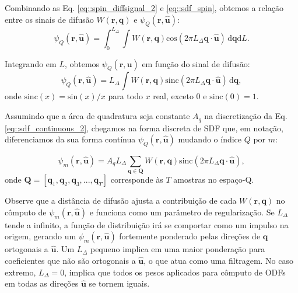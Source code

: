 \documentclass[
    12pt,                %
    oneside,            %
    a4paper,            %
    english,            %
    french,                %
    spanish,            %
    brazil                %
    ]{abntex2}
\begin{document}
Combinando as Eq. \ref{eq::spin_diffsignal_2} e \ref{eq::sdf_spin}, obtemos a relação entre os sinais de difusão $W(\mathbf{r}, \mathbf{q})$ e $\psi_Q(\mathbf{r}, \mathbf{\hat{u}})$:
\begin{equation}
\label{eq::sdf_continuous_1}
    \psi_Q(\mathbf{r}, \mathbf{\hat{u}}) =
    \int_{0}^{L_{\Delta}}\int \! W(\mathbf{r}, \mathbf{q}) \text{cos}(2\pi L_{\Delta} \mathbf{q} \cdot \mathbf{\hat{u}}) \,\mathrm{d}\mathbf{q} \mathrm{d}L .
\end{equation}

Integrando em $L$, obtemos $\psi_Q(\mathbf{r}, \mathbf{\hat{u}})$ em função do sinal de difusão: 
\begin{equation}
\label{eq::sdf_continuous_2}
    \psi_Q(\mathbf{r}, \mathbf{\hat{u}}) =
    L_{\Delta} \int \! W(\mathbf{r}, \mathbf{q}) \text{sinc}(2\pi L_{\Delta} \mathbf{q} \cdot \mathbf{\hat{u}}) \,\mathrm{d}\mathbf{q} ,
\end{equation}
onde $\text{sinc}(x) = \text{sin}(x)/x$ para todo $x$ real, exceto $0$ e $\text{sinc}(0) = 1$.

Assumindo que a área de quadratura seja constante $A_q$ na discretização da Eq. \ref{eq::sdf_continuous_2}, chegamos na forma discreta de SDF que, em notação, diferenciamos da sua forma contínua $\psi_Q(\mathbf{r}, \mathbf{\hat{u}})$ mudando o índice $Q$ por $m$:


\begin{equation}
\label{eq::sdf_discrete_1}
    \psi_m(\mathbf{r}, \mathbf{\hat{u}}) =
     A_qL_{\Delta}\sum_{\mathbf{q} \in \mathbf{Q}} W(\mathbf{r}, \mathbf{q})\text{sinc}(2\pi L_{\Delta} \mathbf{q}\cdot\mathbf{\hat{u}}),
\end{equation}
onde $\mathbf{Q}= [
\mathbf{q}_1,
\mathbf{q}_2,
\mathbf{q}_3, ...,
\mathbf{q}_T
]$ corresponde às $T$ amostras no espaço-Q.

Observe que a distância de difusão ajusta a contribuição de cada $W(\mathbf{r}, \mathbf{q})$ no cômputo de $\psi_m(\mathbf{r}, \mathbf{\hat{u}})$ e funciona como um parâmetro de regularização. Se $L_{\Delta}$ tende a infinito, a função de distribuição irá se comportar como um impulso na origem, gerando um $\psi_m(\mathbf{r}, \mathbf{\hat{u}})$ fortemente ponderado pelas direções de $\mathbf{q}$ ortogonais a $\mathbf{\hat{u}}$. Um $L_{\Delta}$ pequeno implica em uma maior ponderação para coeficientes que não são ortogonais a $\mathbf{\hat{u}}$, o que atua como uma filtragem. No caso extremo, $L_{\Delta} = 0$, implica que todos os pesos aplicados para cômputo de ODFs em todas as direções $\mathbf{\hat{u}}$ se tornem iguais.
\end{document}
